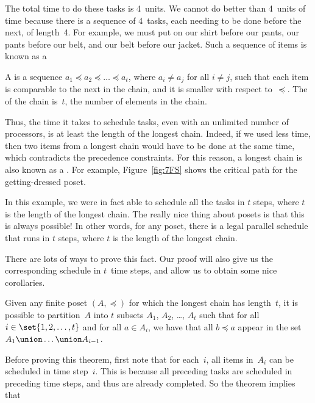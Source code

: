 The total time to do these tasks is 4~units.  We cannot do better than
4~units of time because there is a sequence of 4~tasks, each needing
to be done before the next, of length~4.  For example, we must put on
our shirt before our pants, our pants before our belt, and our belt
before our jacket.  Such a sequence of items is known as a

\begin{definition}\label{def:chain}
A  is a sequence $a_1 \preceq a_2 \preceq \dots \preceq
a_t$, where $a_i \ne a_j$ for all $i \ne j$, such that each item is
comparable to the next in the chain, and it is smaller with respect
to~$\preceq$.  The  of the chain is~$t$, the number of
elements in the chain.
\end{definition}

Thus, the time it takes to schedule tasks, even with an unlimited
number of processors, is at least the length of the longest chain.
Indeed, if we used less time, then two items from a longest chain
would have to be done at the same time, which contradicts the
precedence constraints.  For this reason, a longest chain is also
known as a .  For example, Figure~\ref{fig:7FS}
shows the critical path for the getting-dressed poset.

In this example, we were in fact able to schedule all the tasks in $t$
steps, where $t$ is the length of the longest chain.  The really nice
thing about posets is that this is always possible!  In other words,
for any poset, there is a legal parallel schedule that runs in $t$
steps, where $t$ is the length of the longest chain.

There are lots of ways to prove this fact.  Our proof will also give
us the corresponding schedule in $t$~time steps, and allow us to
obtain some nice corollaries.

\begin{theorem}\label{thm:poset-partition}
Given any finite poset $(A, \preceq)$ for which the longest chain has
length~$t$, it is possible to partition~$A$ into $t$ subsets $A_1$,
$A_2$, \dots, $A_t$ such that for all $i \in \set{1, 2, \dots, t}$ and
for all $a \in A_i$, we have that all $b \preceq a$ appear in the set
$A_1 \union \dots \union A_{i - 1}$.
\end{theorem}

Before proving this theorem, first note that for each~$i$, all items
in~$A_i$ can be scheduled in time step~$i$.  This is because all
preceding tasks are scheduled in preceding time steps, and thus are
already completed.  So the theorem implies that

